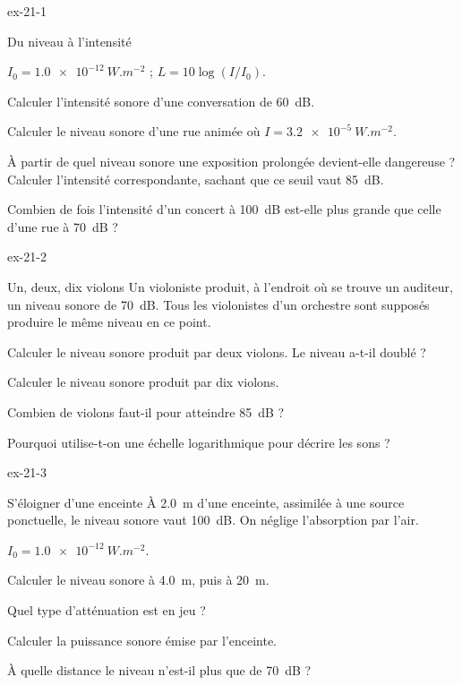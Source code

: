 \begin{blocLivre}{ex-21-1}
\begin{exercice}[1]{Du niveau à l'intensité}
\begin{donnees}
$I_0=\qty{1,0e-12}{W.m^{-2}}$ ; $L=10\log(I/I_0)$.
\end{donnees}
\begin{questions}
\item Calculer l'intensité sonore d'une conversation de \qty{60}{dB}.
\item Calculer le niveau sonore d'une rue animée où $I=\qty{3,2e-5}{W.m^{-2}}$.
\item À partir de quel niveau sonore une exposition prolongée devient-elle dangereuse ? Calculer l'intensité
correspondante, sachant que ce seuil vaut \qty{85}{dB}.
\item Combien de fois l'intensité d'un concert à \qty{100}{dB} est-elle plus grande que celle d'une rue à \qty{70}{dB} ?
\end{questions}
\end{exercice}
\end{blocLivre}
\begin{blocLivre}{ex-21-2}
\begin{exercice}[1]{Un, deux, dix violons}
Un violoniste produit, à l'endroit où se trouve un auditeur, un niveau sonore de \qty{70}{dB}. Tous les violonistes
d'un orchestre sont supposés produire le même niveau en ce point.
\begin{questions}
\item Calculer le niveau sonore produit par deux violons. Le niveau a-t-il doublé ?
\item Calculer le niveau sonore produit par dix violons.
\item Combien de violons faut-il pour atteindre \qty{85}{dB} ?
\item Pourquoi utilise-t-on une échelle logarithmique pour décrire les sons ?
\end{questions}
\end{exercice}
\end{blocLivre}
\begin{blocLivre}{ex-21-3}
\begin{exercice}[1]{S'éloigner d'une enceinte}
À \qty{2,0}{m} d'une enceinte, assimilée à une source ponctuelle, le niveau sonore vaut \qty{100}{dB}. On néglige
l'absorption par l'air.
\begin{donnees}
$I_0=\qty{1,0e-12}{W.m^{-2}}$.
\end{donnees}
\begin{questions}
\item Calculer le niveau sonore à \qty{4,0}{m}, puis à \qty{20}{m}.
\item Quel type d'atténuation est en jeu ?
\item Calculer la puissance sonore émise par l'enceinte.
\item À quelle distance le niveau n'est-il plus que de \qty{70}{dB} ?
\end{questions}
\end{exercice}
\end{blocLivre}
